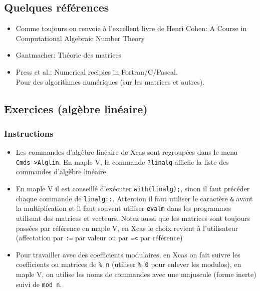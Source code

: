\documentclass[a4paper,11pt]{article}
\begin{document}
\begin{giacjshere}
\subsection{Quelques r\'ef\'erences} \label{sec:ref}

\begin{itemize}
\item Comme toujours on renvoie à l'excellent livre de Henri Cohen:
A Course in Computational Algebraic Number Theory

\item Gantmacher: Th\'eorie des matrices


\item Press et al.: Numerical recipies in Fortran/C/Pascal.\\
Pour des algorithmes numériques (sur les matrices et autres).

\end{itemize}


\subsection{Exercices (alg\`ebre lin\'eaire)}
\subsubsection{Instructions}
\begin{itemize}
\item Les commandes d'alg\`ebre lin\'eaire de Xcas sont
regroup\'ees dans le menu {\tt Cmds->Alglin}.
En maple V, la commande {\tt ?linalg} affiche
la liste des commandes d'algèbre linéaire. 
\item En maple V il est conseillé d'exécuter {\tt with(linalg);},
sinon il faut précéder
chaque commande de {\tt linalg::}.
Attention
il faut utiliser le caractère {\tt \&} avant la multiplication
et il faut souvent utiliser {\tt evalm} dans les programmes
utilisant des matrices et vecteurs. Notez aussi que les
matrices sont toujours pass\'ees par r\'ef\'erence en maple V,
en Xcas le choix revient \`a l'utilisateur (affectation par \verb|:=|
par valeur ou par \verb|=<| par r\'ef\'erence)
\item Pour travailler avec des
coefficients modulaires, en Xcas
on fait suivre les coefficients ou matrices de {\tt \% n}
(utiliser \verb|% 0| pour enlever les modulos),
en maple V, on utilise les noms de commandes
avec une majuscule (forme inerte) suivi de {\tt mod n}.
\end{itemize}



\end{giacjshere}
\end{document}
